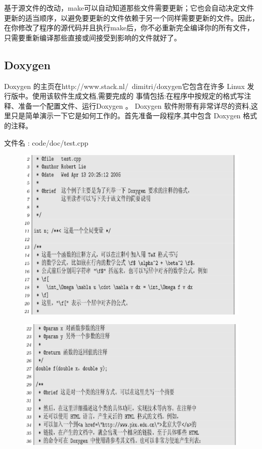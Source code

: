 \documentclass[12pt,a4paper]{article}
\begin{document}
基于源文件的改动，make可以自动知道那些文件需要更新；它也会自动决定文件更新的适当顺序，以避免要更新的文件依赖于另一个同样需要更新的文件。因此，在你修改了程序的源代码并且执行make后，你不必重新完全编译你的所有文件，只需要重新编译那些直接或间接受到影响的文件就好了。

\subsection{ Doxygen }
Doxygen 的主页在http://www.stack.nl/~dimitri/doxygen它包含在许多 Linux 发行版中。使用该软件生成文档,需要完成的
事情包括:在程序中按规定的格式写注释、准备一个配置文件、运行Doxygen 。 Doxygen 软件附带有非常详尽的资料,这里只是简单演示一下它是如何工作的。首先准备一段程序,其中包含 Doxygen 格式的注释。

文件名 : code/doc/test.cpp
\begin{figure}[H]
\centering
\includegraphics[scale=0.5]{./figures/14.png}
\caption{}
\end{figure}

\begin{figure}[H]
\centering
\includegraphics[scale=0.5]{./figures/15.png}
\caption{}
\end{figure}
\end{document}
